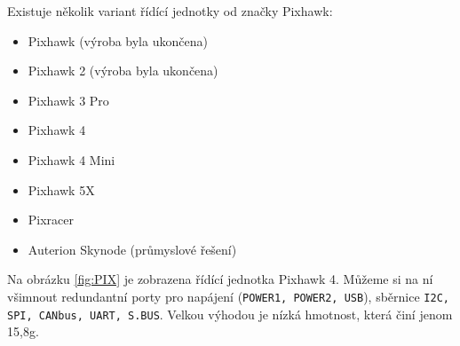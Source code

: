 Existuje několik variant řídící jednotky od značky Pixhawk:

\begin{itemize}
    \item Pixhawk (výroba byla ukončena)
    \item Pixhawk 2 (výroba byla ukončena)
    \item Pixhawk 3 Pro
    \item Pixhawk 4
    \item Pixhawk 4 Mini
    \item Pixhawk 5X
    \item Pixracer
    \item Auterion Skynode (průmyslové řešení)
\end{itemize}

Na obrázku \ref{fig:PIX} je zobrazena řídící jednotka Pixhawk 4. Můžeme si na ní všimnout redundantní porty pro napájení (\texttt{POWER1, POWER2, USB}), sběrnice \texttt{I2C, SPI, CANbus, UART, S.BUS}. Velkou výhodou je nízká hmotnost, která činí jenom 15,8g. \cite{PIX2}


